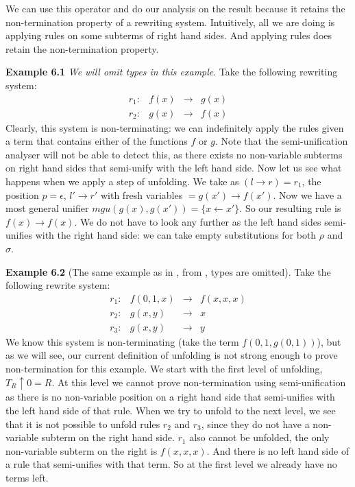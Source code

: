 We can use this operator and do our analysis on the result because it retains the non-termination property of a rewriting system. Intuitively, all we are doing is applying rules on some subterms of right hand sides. And applying rules does retain the non-termination property. 

\textbf{Example 6.1} \textit{We will omit types in this example}. Take the following rewriting system: 
\[
\begin{array}{lrcl}
    r_1: & f(x) & \rightarrow & g(x) \\
    r_2: & g(x) & \rightarrow & f(x)
\end{array}
\]
Clearly, this system is non-terminating: we can indefinitely apply the rules given a term that contains either of the functions $f$ or $g$. Note that the semi-unification analyser will not be able to detect this, as there exists no non-variable subterms on right hand sides that semi-unify with the left hand side. Now let us see what happens when we apply a step of unfolding. We take as $(l \rightarrow r) = r_1$, the position $p = \epsilon$, $l' \rightarrow r'$ with fresh variables $ = g(x') \rightarrow f(x')$. Now we have a most general unifier $\textit{mgu}(g(x), g(x')) = \{ x \leftarrow x' \}$. So our resulting rule is $f(x) \rightarrow f(x)$. We do not have to look any further as the left hand sides semi-unifies with the right hand side: we can take empty substitutions for both $\rho$ and $\sigma$. 

\textbf{Example 6.2} (The same example as in \cite{Payet:Unfolding}, from \cite{TOYAMA1987141}, types are omitted). Take the following rewrite system: 
\[
\begin{array}{lrcl}
    r_1: & f(0, 1, x) & \rightarrow & f(x, x, x) \\
    r_2: & g(x, y) & \rightarrow & x \\
    r_3: & g(x, y) & \rightarrow & y
\end{array}
\]
We know this system is non-terminating (take the term $f(0, 1, g(0, 1))$), but as we will see, our current definition of unfolding is not strong enough to prove non-termination for this example. We start with the first level of unfolding, $T_R \uparrow 0 = R$. At this level we cannot prove non-termination using semi-unification as there is no non-variable position on a right hand side that semi-unifies with the left hand side of that rule. When we try to unfold to the next level, we see that it is not possible to unfold rules $r_2$ and $r_3$, since they do not have a non-variable subterm on the right hand side. $r_1$ also cannot be unfolded, the only non-variable subterm on the right is $f(x, x, x)$. And there is no left hand side of a rule that semi-unifies with that term. So at the first level we already have no terms left.  

